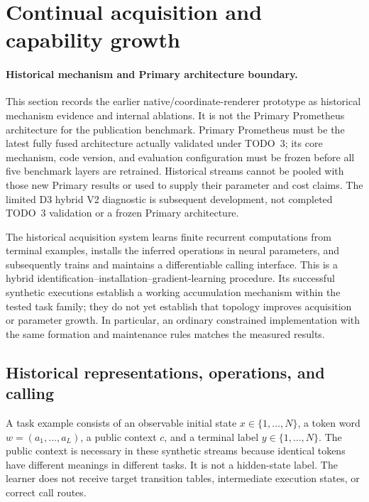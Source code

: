 \section{Continual acquisition and capability growth}
\label{sec:capability-growth}

\paragraph{Historical mechanism and Primary architecture boundary.}
This section records the earlier native/coordinate-renderer prototype as
historical mechanism evidence and internal ablations. It is not the Primary
Prometheus architecture for the publication benchmark. Primary Prometheus must
be the latest fully fused architecture actually validated under TODO~3; its
core mechanism, code version, and evaluation configuration must be frozen
before all five benchmark layers are retrained. Historical streams cannot be
pooled with those new Primary results or used to supply their parameter and
cost claims. The limited D3 hybrid V2 diagnostic is subsequent development,
not completed TODO~3 validation or a frozen Primary architecture.

The historical acquisition system learns finite recurrent computations from terminal
examples, installs the inferred operations in neural parameters, and subsequently
trains and maintains a differentiable calling interface. This is a hybrid
identification--installation--gradient-learning procedure. Its successful
synthetic executions establish a working accumulation mechanism within the
tested task family; they do not yet establish that topology improves acquisition
or parameter growth. In particular, an ordinary constrained implementation with
the same formation and maintenance rules matches the measured results.

\subsection{Historical representations, operations, and calling}

A task example consists of an observable initial state $x\in\{1,\ldots,N\}$,
a token word $w=(a_1,\ldots,a_L)$, a public context $c$, and a terminal label
$y\in\{1,\ldots,N\}$. The public context is necessary in these synthetic
streams because identical tokens have different meanings in different tasks.
It is not a hidden-state label. The learner does not receive target transition
tables, intermediate execution states, or correct call routes.

